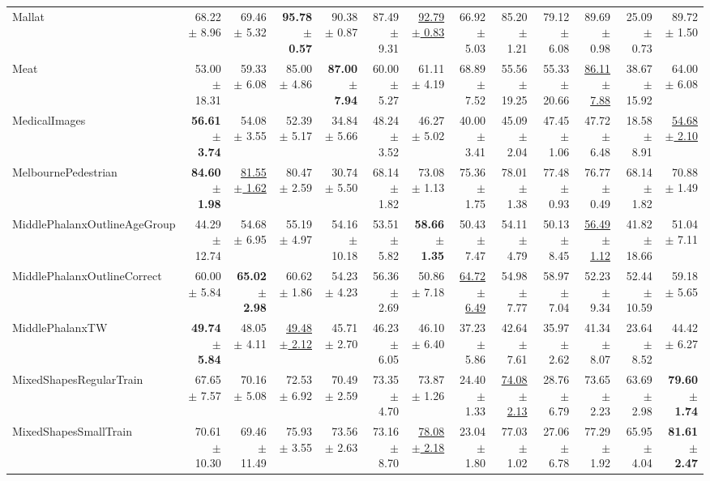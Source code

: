 \begin{landscape}
\begin{longtable}{lrrrrrrrrrrrr}
Mallat & 68.22 $\pm$ 8.96 & 69.46 $\pm$ 5.32 & \textbf{95.78 $\pm$ 0.57} & 90.38 $\pm$ 0.87 & 87.49 $\pm$ 9.31 & \underline{92.79 $\pm$ 0.83} & 66.92 $\pm$ 5.03 & 85.20 $\pm$ 1.21 & 79.12 $\pm$ 6.08 & 89.69 $\pm$ 0.98 & 25.09 $\pm$ 0.73 & 89.72 $\pm$ 1.50 \\
Meat & 53.00 $\pm$ 18.31 & 59.33 $\pm$ 6.08 & 85.00 $\pm$ 4.86 & \textbf{87.00 $\pm$ 7.94} & 60.00 $\pm$ 5.27 & 61.11 $\pm$ 4.19 & 68.89 $\pm$ 7.52 & 55.56 $\pm$ 19.25 & 55.33 $\pm$ 20.66 & \underline{86.11 $\pm$ 7.88} & 38.67 $\pm$ 15.92 & 64.00 $\pm$ 6.08 \\
MedicalImages & \textbf{56.61 $\pm$ 3.74} & 54.08 $\pm$ 3.55 & 52.39 $\pm$ 5.17 & 34.84 $\pm$ 5.66 & 48.24 $\pm$ 3.52 & 46.27 $\pm$ 5.02 & 40.00 $\pm$ 3.41 & 45.09 $\pm$ 2.04 & 47.45 $\pm$ 1.06 & 47.72 $\pm$ 6.48 & 18.58 $\pm$ 8.91 & \underline{54.68 $\pm$ 2.10} \\
MelbournePedestrian & \textbf{84.60 $\pm$ 1.98} & \underline{81.55 $\pm$ 1.62} & 80.47 $\pm$ 2.59 & 30.74 $\pm$ 5.50 & 68.14 $\pm$ 1.82 & 73.08 $\pm$ 1.13 & 75.36 $\pm$ 1.75 & 78.01 $\pm$ 1.38 & 77.48 $\pm$ 0.93 & 76.77 $\pm$ 0.49 & 68.14 $\pm$ 1.82 & 70.88 $\pm$ 1.49 \\
MiddlePhalanxOutlineAgeGroup & 44.29 $\pm$ 12.74 & 54.68 $\pm$ 6.95 & 55.19 $\pm$ 4.97 & 54.16 $\pm$ 10.18 & 53.51 $\pm$ 5.82 & \textbf{58.66 $\pm$ 1.35} & 50.43 $\pm$ 7.47 & 54.11 $\pm$ 4.79 & 50.13 $\pm$ 8.45 & \underline{56.49 $\pm$ 1.12} & 41.82 $\pm$ 18.66 & 51.04 $\pm$ 7.11 \\
MiddlePhalanxOutlineCorrect & 60.00 $\pm$ 5.84 & \textbf{65.02 $\pm$ 2.98} & 60.62 $\pm$ 1.86 & 54.23 $\pm$ 4.23 & 56.36 $\pm$ 2.69 & 50.86 $\pm$ 7.18 & \underline{64.72 $\pm$ 6.49} & 54.98 $\pm$ 7.77 & 58.97 $\pm$ 7.04 & 52.23 $\pm$ 9.34 & 52.44 $\pm$ 10.59 & 59.18 $\pm$ 5.65 \\
MiddlePhalanxTW & \textbf{49.74 $\pm$ 5.84} & 48.05 $\pm$ 4.11 & \underline{49.48 $\pm$ 2.12} & 45.71 $\pm$ 2.70 & 46.23 $\pm$ 6.05 & 46.10 $\pm$ 6.40 & 37.23 $\pm$ 5.86 & 42.64 $\pm$ 7.61 & 35.97 $\pm$ 2.62 & 41.34 $\pm$ 8.07 & 23.64 $\pm$ 8.52 & 44.42 $\pm$ 6.27 \\
MixedShapesRegularTrain & 67.65 $\pm$ 7.57 & 70.16 $\pm$ 5.08 & 72.53 $\pm$ 6.92 & 70.49 $\pm$ 2.59 & 73.35 $\pm$ 4.70 & 73.87 $\pm$ 1.26 & 24.40 $\pm$ 1.33 & \underline{74.08 $\pm$ 2.13} & 28.76 $\pm$ 6.79 & 73.65 $\pm$ 2.23 & 63.69 $\pm$ 2.98 & \textbf{79.60 $\pm$ 1.74} \\
MixedShapesSmallTrain & 70.61 $\pm$ 10.30 & 69.46 $\pm$ 11.49 & 75.93 $\pm$ 3.55 & 73.56 $\pm$ 2.63 & 73.16 $\pm$ 8.70 & \underline{78.08 $\pm$ 2.18} & 23.04 $\pm$ 1.80 & 77.03 $\pm$ 1.02 & 27.06 $\pm$ 6.78 & 77.29 $\pm$ 1.92 & 65.95 $\pm$ 4.04 & \textbf{81.61 $\pm$ 2.47} \\

\end{longtable}
\end{landscape}

